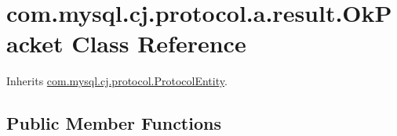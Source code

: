 \hypertarget{classcom_1_1mysql_1_1cj_1_1protocol_1_1a_1_1result_1_1_ok_packet}{}\section{com.\+mysql.\+cj.\+protocol.\+a.\+result.\+Ok\+Packet Class Reference}
\label{classcom_1_1mysql_1_1cj_1_1protocol_1_1a_1_1result_1_1_ok_packet}


Inherits \mbox{\hyperlink{interfacecom_1_1mysql_1_1cj_1_1protocol_1_1_protocol_entity}{com.\+mysql.\+cj.\+protocol.\+Protocol\+Entity}}.

\subsection*{Public Member Functions}
